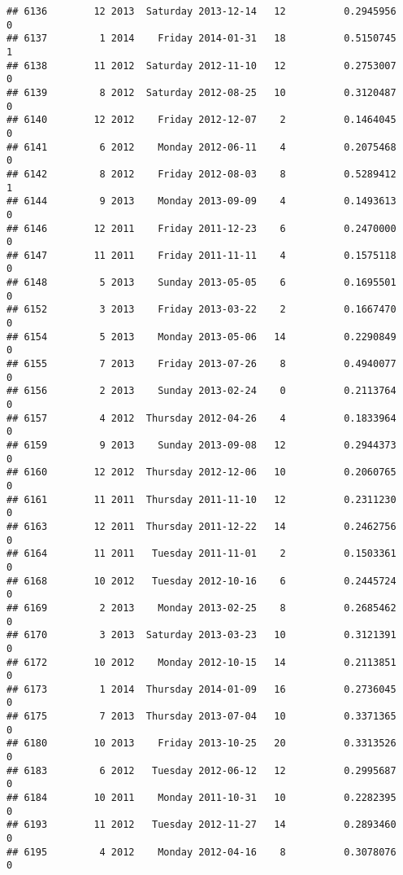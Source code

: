 \documentclass[
]{article}
\begin{document}
\begin{verbatim}
## 6136        12 2013  Saturday 2013-12-14   12          0.2945956             0
## 6137         1 2014    Friday 2014-01-31   18          0.5150745             1
## 6138        11 2012  Saturday 2012-11-10   12          0.2753007             0
## 6139         8 2012  Saturday 2012-08-25   10          0.3120487             0
## 6140        12 2012    Friday 2012-12-07    2          0.1464045             0
## 6141         6 2012    Monday 2012-06-11    4          0.2075468             0
## 6142         8 2012    Friday 2012-08-03    8          0.5289412             1
## 6144         9 2013    Monday 2013-09-09    4          0.1493613             0
## 6146        12 2011    Friday 2011-12-23    6          0.2470000             0
## 6147        11 2011    Friday 2011-11-11    4          0.1575118             0
## 6148         5 2013    Sunday 2013-05-05    6          0.1695501             0
## 6152         3 2013    Friday 2013-03-22    2          0.1667470             0
## 6154         5 2013    Monday 2013-05-06   14          0.2290849             0
## 6155         7 2013    Friday 2013-07-26    8          0.4940077             0
## 6156         2 2013    Sunday 2013-02-24    0          0.2113764             0
## 6157         4 2012  Thursday 2012-04-26    4          0.1833964             0
## 6159         9 2013    Sunday 2013-09-08   12          0.2944373             0
## 6160        12 2012  Thursday 2012-12-06   10          0.2060765             0
## 6161        11 2011  Thursday 2011-11-10   12          0.2311230             0
## 6163        12 2011  Thursday 2011-12-22   14          0.2462756             0
## 6164        11 2011   Tuesday 2011-11-01    2          0.1503361             0
## 6168        10 2012   Tuesday 2012-10-16    6          0.2445724             0
## 6169         2 2013    Monday 2013-02-25    8          0.2685462             0
## 6170         3 2013  Saturday 2013-03-23   10          0.3121391             0
## 6172        10 2012    Monday 2012-10-15   14          0.2113851             0
## 6173         1 2014  Thursday 2014-01-09   16          0.2736045             0
## 6175         7 2013  Thursday 2013-07-04   10          0.3371365             0
## 6180        10 2013    Friday 2013-10-25   20          0.3313526             0
## 6183         6 2012   Tuesday 2012-06-12   12          0.2995687             0
## 6184        10 2011    Monday 2011-10-31   10          0.2282395             0
## 6193        11 2012   Tuesday 2012-11-27   14          0.2893460             0
## 6195         4 2012    Monday 2012-04-16    8          0.3078076             0

\end{verbatim}
\end{document}
